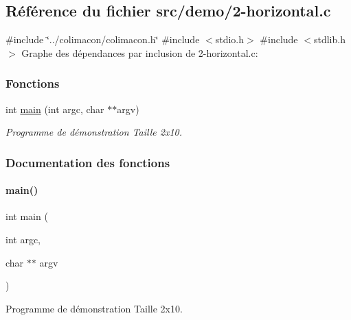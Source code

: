\hypertarget{2-horizontal_8c}{}\subsection{Référence du fichier src/demo/2-\/horizontal.c}
\label{2-horizontal_8c}
{\ttfamily \#include \char`\"{}../colimacon/colimacon.\+h\char`\"{}}\newline
{\ttfamily \#include $<$stdio.\+h$>$}\newline
{\ttfamily \#include $<$stdlib.\+h$>$}\newline
Graphe des dépendances par inclusion de 2-\/horizontal.c\+:
\subsubsection*{Fonctions}
\begin{DoxyCompactItemize}
\item 
int \hyperlink{2-horizontal_8c_a3c04138a5bfe5d72780bb7e82a18e627}{main} (int argc, char $\ast$$\ast$argv)
\begin{DoxyCompactList}\small\item\em Programme de démonstration Taille 2x10. \end{DoxyCompactList}\end{DoxyCompactItemize}


\subsubsection{Documentation des fonctions}
\mbox{\label{2-horizontal_8c_a3c04138a5bfe5d72780bb7e82a18e627}} 
\paragraph{\texorpdfstring{main()}{main()}}
{\footnotesize\ttfamily int main (\begin{DoxyParamCaption}\item[{int}]{argc,  }\item[{char $\ast$$\ast$}]{argv }\end{DoxyParamCaption})}



Programme de démonstration Taille 2x10. 

